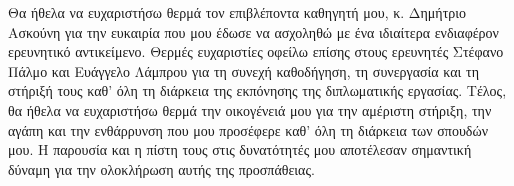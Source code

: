 \begin{acknowledgements}
Θα ήθελα να ευχαριστήσω θερμά τον επιβλέποντα καθηγητή μου, κ. Δημήτριο Ασκούνη για την ευκαιρία που μου έδωσε να ασχοληθώ με ένα ιδιαίτερα ενδιαφέρον ερευνητικό αντικείμενο.
Θερμές ευχαριστίες οφείλω επίσης στους ερευνητές Στέφανο Πάλμο και Ευάγγελο Λάμπρου για τη συνεχή καθοδήγηση, τη συνεργασία και τη στήριξή τους καθ’ όλη τη διάρκεια της εκπόνησης της διπλωματικής εργασίας.
Τέλος, θα ήθελα να ευχαριστήσω θερμά την οικογένειά μου για την αμέριστη στήριξη, την αγάπη και την ενθάρρυνση που μου προσέφερε καθ’ όλη τη διάρκεια των σπουδών μου. Η παρουσία και η πίστη τους στις δυνατότητές μου αποτέλεσαν σημαντική δύναμη για την ολοκλήρωση αυτής της προσπάθειας.
\end{acknowledgements}